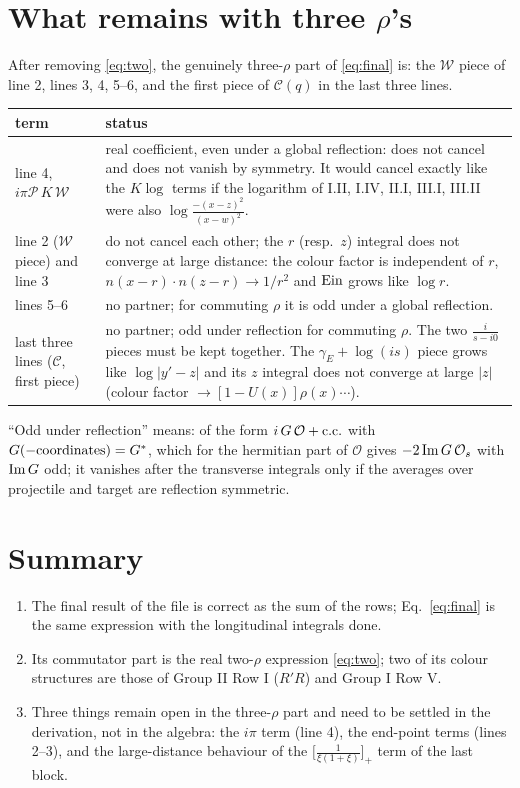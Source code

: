 \documentclass[10pt]{article}
\numberwithin{equation}{section}
\begin{document}
\section{What remains with three $\rho$'s}

After removing \eqref{eq:two}, the genuinely three-$\rho$ part of \eqref{eq:final} is: the $\mathcal{W}$ piece of line 2, lines 3, 4, 5--6, and the first piece of $\mathcal{C}(q)$ in the last three lines.
\begin{center}
\renewcommand{\arraystretch}{1.3}
\begin{tabular}{p{4.6cm}|p{11.6cm}}
term & status\\ \hline
line 4, $i\pi\mathcal{P}\,K\,\mathcal{W}$ & real coefficient, even under a global reflection: does not cancel and does not vanish by symmetry. It would cancel exactly like the $K\log$ terms if the logarithm of I.II, I.IV, II.I, III.I, III.II were also $\log\frac{-(x-z)^{2}}{(x-w)^{2}}$.\\
line 2 ($\mathcal{W}$ piece) and line 3 & do not cancel each other; the $r$ (resp.\ $z$) integral does not converge at large distance: the colour factor is independent of $r$, $n(x-r)\cdot n(z-r)\to1/r^{2}$ and ${\rm Ein}$ grows like $\log r$.\\
lines 5--6 & no partner; for commuting $\rho$ it is odd under a global reflection.\\
last three lines ($\mathcal{C}$, first piece) & no partner; odd under reflection for commuting $\rho$. The two $\frac{i}{s-i0}$ pieces must be kept together. The $\gamma_{E}+\log(is)$ piece grows like $\log|y'-z|$ and its $z$ integral does not converge at large $|z|$ (colour factor $\to[1-U(x)]\rho(x)\cdots$).
\end{tabular}
\end{center}
``Odd under reflection'' means: of the form $i\,G\,\mathcal{O}+{\rm c.c.}$ with $G(-{\rm coordinates})=G^{*}$, which for the hermitian part of $\mathcal{O}$ gives $-2\,{\rm Im}\,G\,\mathcal{O}_{s}$ with ${\rm Im}\,G$ odd; it vanishes after the transverse integrals only if the averages over projectile and target are reflection symmetric.

\section{Summary}
\begin{enumerate}
\item The final result of the file is correct as the sum of the rows; Eq.~\eqref{eq:final} is the same expression with the longitudinal integrals done.
\item Its commutator part is the real two-$\rho$ expression \eqref{eq:two}; two of its colour structures are those of Group II Row I ($R'R$) and Group I Row V.
\item Three things remain open in the three-$\rho$ part and need to be settled in the derivation, not in the algebra: the $i\pi$ term (line 4), the end-point terms (lines 2--3), and the large-distance behaviour of the $\big[\frac{1}{\xi(1+\xi)}\big]_{+}$ term of the last block.
\end{enumerate}
\end{document}
